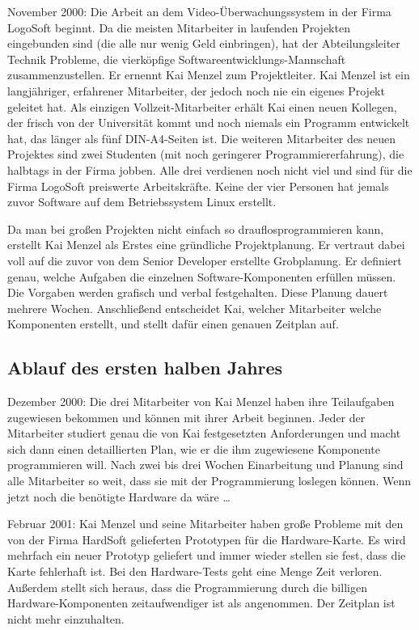 November 2000: Die Arbeit an dem Video-Überwachungssystem in der Firma LogoSoft
beginnt. Da die meisten Mitarbeiter in laufenden Projekten eingebunden sind
(die alle nur wenig Geld einbringen), hat der Abteilungsleiter Technik
Probleme, die vierköpfige Softwareentwicklungs-Mannschaft zusammenzustellen.
Er ernennt Kai Menzel zum Projektleiter. Kai Menzel ist ein langjähriger,
erfahrener Mitarbeiter, der jedoch noch nie ein eigenes Projekt geleitet hat.
Als einzigen Vollzeit-Mitarbeiter erhält Kai einen neuen Kollegen, der frisch
von der Universität kommt und noch niemals ein Programm entwickelt hat, das
länger als fünf DIN-A4-Seiten ist. Die weiteren Mitarbeiter des neuen Projektes
sind zwei Studenten (mit noch geringerer Programmiererfahrung), die halbtags in
der Firma jobben. Alle drei verdienen noch nicht viel und sind für die Firma
LogoSoft preiswerte Arbeitskräfte. Keine der vier Personen hat jemals zuvor
Software auf dem Betriebssystem Linux erstellt.

Da man bei großen Projekten nicht einfach so drauflosprogrammieren kann,
erstellt Kai Menzel als Erstes eine gründliche Projektplanung. Er vertraut
dabei voll auf die zuvor von dem Senior Developer erstellte Grobplanung. Er
definiert genau, welche Aufgaben die einzelnen Software-Komponenten erfüllen
müssen. Die Vorgaben werden grafisch und verbal festgehalten. Diese Planung
dauert mehrere Wochen. Anschließend entscheidet Kai, welcher Mitarbeiter welche
Komponenten erstellt, und stellt dafür einen genauen Zeitplan auf.

\subsection{Ablauf des ersten halben Jahres}

Dezember 2000: Die drei Mitarbeiter von Kai Menzel haben ihre Teilaufgaben
zugewiesen bekommen und können mit ihrer Arbeit beginnen. Jeder der Mitarbeiter
studiert genau die von Kai festgesetzten Anforderungen und macht sich dann
einen detaillierten Plan, wie er die ihm zugewiesene Komponente programmieren
will. Nach zwei bis drei Wochen Einarbeitung und Planung sind alle Mitarbeiter
so weit, dass sie mit der Programmierung loslegen können. Wenn jetzt noch die
benötigte Hardware da wäre \ldots

Februar 2001: Kai Menzel und seine Mitarbeiter haben große Probleme mit den von
der Firma HardSoft gelieferten Prototypen für die Hardware-Karte. Es wird
mehrfach ein neuer Prototyp geliefert und immer wieder stellen sie fest, dass
die Karte fehlerhaft ist. Bei den Hardware-Tests geht eine Menge Zeit verloren.
Außerdem stellt sich heraus, dass die Programmierung durch die billigen
Hardware-Komponenten zeitaufwendiger ist als angenommen. Der Zeitplan ist nicht
mehr einzuhalten.


